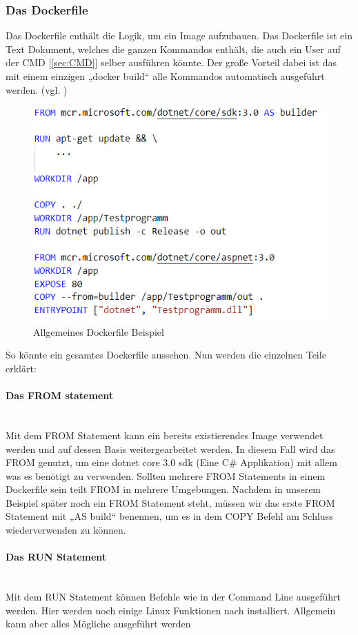 \subsubsection{Das Dockerfile}\label{ssec:Dockerfile}
Das Dockerfile enthält die Logik, um ein Image aufzubauen. Das Dockerfile ist ein Text Dokument, welches die ganzen Kommandos enthält, die auch ein User auf der CMD [\ref{sec:CMD}] selber ausführen könnte. Der große Vorteil dabei ist das mit einem einzigen „docker build“ alle Kommandos automatisch ausgeführt werden. (vgl. \cite{Dockerfile})
\begin{figure}[H]
    \includegraphics{images/dockerfile_example.PNG}
    \caption{Allgemeines Dockerfile Beispiel}
    \label{img:dockerfile_example}
\end{figure}
So könnte ein gesamtes Dockerfile aussehen.
Nun werden die einzelnen Teile erklärt:
\paragraph{Das FROM statement}\mbox{}\\
Mit dem FROM Statement kann ein bereits existierendes Image verwendet werden und auf dessen Basis weitergearbeitet werden. In diesem Fall wird das FROM genutzt, um eine dotnet core 3.0 sdk (Eine C\# Applikation) mit allem was es benötigt zu verwenden. Sollten mehrere FROM Statements in einem Dockerfile sein teilt FROM in mehrere Umgebungen. Nachdem in unserem Beispiel später noch ein FROM Statement steht, müssen wir das erste FROM Statement mit „AS build“ benennen, um es in dem COPY Befehl am Schluss wiederverwenden zu können. 
\paragraph{Das RUN Statement}\mbox{}\\
Mit dem RUN Statement können Befehle wie in der Command Line ausgeführt werden. Hier werden noch einige Linux Funktionen nach installiert. Allgemein kann aber alles Mögliche ausgeführt werden
